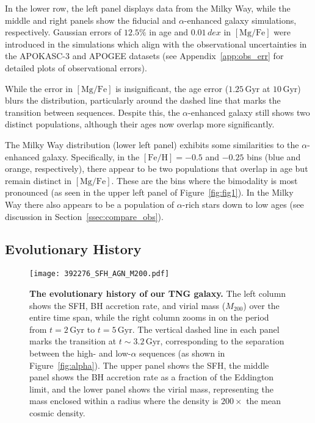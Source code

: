 \documentclass[twocolumn,linenumbers]{aastex631}
\newcommand{\Gyr}{\ensuremath{\textrm{Gyr}}}
\newcommand{\FeH}{\ensuremath{[\textrm{Fe}/\textrm{H}]}}
\newcommand{\MgFe}{\ensuremath{[\textrm{Mg}/\textrm{Fe}]}}
\begin{document}
In the lower row, the left panel displays data from the Milky Way, while the middle and right panels show the fiducial and $\alpha$-enhanced galaxy simulations, respectively. Gaussian errors of $12.5\%$ in age and $0.01\,dex$ in \MgFe{} were introduced in the simulations which align with the observational uncertainties in the APOKASC-3 and APOGEE datasets (see Appendix~\ref{app:obs_err} for detailed plots of observational errors).

While the error in \MgFe{} is insignificant, the age error ($1.25\,\Gyr$ at $10\,\Gyr$) blurs the distribution, particularly around the dashed line that marks the transition between sequences. Despite this, the $\alpha$-enhanced galaxy still shows two distinct populations, although their ages now overlap more significantly.

The Milky Way distribution (lower left panel) exhibits some similarities to the $\alpha$-enhanced galaxy. Specifically, in the $\FeH=-0.5$ and $-0.25$ bins (blue and orange, respectively), there appear to be two populations that overlap in age but remain distinct in \MgFe{}. These are the bins where the bimodality is most pronounced (as seen in the upper left panel of Figure~\ref{fig:fig1}). In the Milky Way there also appears to be a population of $\alpha$-rich stars down to low ages (see discussion in Section~\ref{ssec:compare_obs}).

\subsection{Evolutionary History}\label{ssec:evol}
\begin{figure}
  \centering
  \texttt{[image: 392276\_SFH\_AGN\_M200.pdf]}
  \caption{\textbf{The evolutionary history of our TNG galaxy.} The left column shows the SFH, BH accretion rate, and virial mass ($M_{200}$) over the entire time span, while the right column zooms in on the period from $t=2\,\Gyr$ to $t=5\,\Gyr$. The vertical dashed line in each panel marks the transition at $t\sim3.2\,\Gyr$, corresponding to the separation between the high- and low-$\alpha$ sequences (as shown in Figure~\ref{fig:alpha}). The upper panel shows the SFH, the middle panel shows the BH accretion rate as a fraction of the Eddington limit, and the lower panel shows the virial mass, representing the mass enclosed within a radius where the density is $200\times$ the mean cosmic density.}
  \label{fig:history}
\end{figure}
\end{document}

